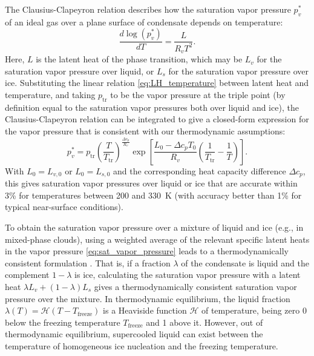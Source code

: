 \documentclass{report}
\begin{document}
The Clausius-Clapeyron relation describes how the saturation vapor pressure $p_v^*$ of an ideal gas over a plane surface of condensate depends on temperature:
\begin{equation}
    \frac{d \log(p_v^*)}{dT} = \frac{L}{R_v T^2}.
\end{equation}
Here, $L$ is the latent heat of the phase transition, which may be $L_v$ for the saturation vapor pressure over liquid, or $L_s$ for the saturation vapor pressure over ice. Substituting the linear relation \eqref{eq:LH_temperature} between latent heat and temperature, and taking $p_\mathrm{tr}$ to be the vapor pressure at the triple point (by definition equal to the saturation vapor pressures both over liquid and ice), the Clausius-Clapeyron relation can be integrated to give a closed-form expression for the vapor pressure that is consistent with our thermodynamic assumptions:
\begin{equation}
    p_v^* = p_{\mathrm{tr}} \left( \frac{T}{T_{\mathrm{tr}}} \right)^{\frac{\Delta c_p}{R_v}}
        \exp \left[ \frac{L_0 - \Delta c_p T_0}{R_v} 
        \left( \frac{1}{T_{\mathrm{tr}}} - \frac{1}{T} \right) \right].
        \label{eq:sat_vapor_pressure}
\end{equation}
With $L_0 = L_{v,0}$ or $L_0 = L_{s,0}$ and the corresponding heat capacity difference $\Delta c_p$, this gives saturation vapor pressures over liquid or ice that are accurate within 3\% for temperatures between 200 and 330~K (with accuracy better than 1\% for typical near-surface conditions).

To obtain the saturation vapor pressure over a mixture of liquid and ice (e.g., in mixed-phase clouds), using a weighted average of the relevant specific latent heats in the vapor pressure \eqref{eq:sat_vapor_pressure} leads to a thermodynamically consistent formulation \citep{Pressel15a}. That is, if a fraction $\lambda$ of the condensate is liquid and the complement $1-\lambda$ is ice, calculating the saturation vapor pressure with a latent heat $\lambda L_v + (1-\lambda)L_s$ gives a thermodynamically consistent saturation vapor pressure over the mixture. In thermodynamic equilibrium, the liquid fraction $\lambda(T) = \mathcal{H}(T-T_{\mathrm{freeze}})$ is a Heaviside function $\mathcal{H}$ of temperature, being zero 0 below the freezing temperature $T_{\mathrm{freeze}}$ and 1 above it. However, out of thermodynamic equilibrium, supercooled liquid can exist between the temperature of homogeneous ice nucleation and the freezing temperature.
\end{document}
